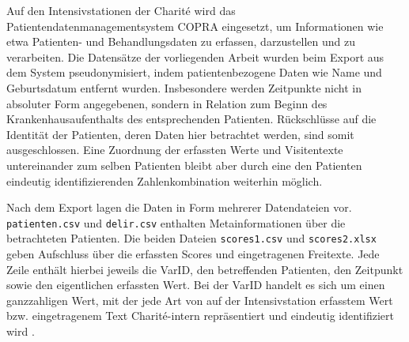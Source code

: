 Auf den Intensivstationen der Charité wird das Patientendatenmanagementsystem COPRA eingesetzt, um Informationen wie etwa Patienten- und Behandlungsdaten zu erfassen, darzustellen und zu verarbeiten. Die Datensätze der vorliegenden Arbeit wurden beim Export aus dem System pseudonymisiert, indem patientenbezogene Daten wie Name und Geburtsdatum entfernt wurden. Insbesondere werden Zeitpunkte nicht in absoluter Form angegebenen, sondern in Relation zum Beginn des Krankenhausaufenthalts des entsprechenden Patienten. Rückschlüsse auf die Identität der Patienten, deren Daten hier betrachtet werden, sind somit ausgeschlossen. Eine Zuordnung der erfassten Werte und Visitentexte untereinander zum selben Patienten bleibt aber durch eine den Patienten eindeutig identifizierenden Zahlenkombination weiterhin möglich.

Nach dem Export lagen die Daten in Form mehrerer Datendateien vor. \texttt{patienten.csv} und \texttt{delir.csv} enthalten Metainformationen über die betrachteten Patienten. Die beiden Dateien \texttt{scores1.csv} und \texttt{scores2.xlsx} geben Aufschluss über die erfassten Scores und eingetragenen Freitexte. Jede Zeile enthält hierbei jeweils die VarID, den betreffenden Patienten, den Zeitpunkt sowie den eigentlichen erfassten Wert. Bei der VarID handelt es sich um einen ganzzahligen Wert, mit der jede Art von auf der Intensivstation erfasstem Wert bzw. eingetragenem Text Charité-intern repräsentiert und eindeutig identifiziert wird .

